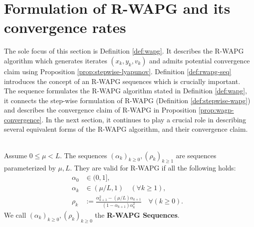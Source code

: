 \documentclass[12pt]{article}
\begin{document}
\section{Formulation of R-WAPG and its convergence rates}
    The sole focus of this section is Definition \ref{def:wapg}.
    It describes the R-WAPG algorithm which generates iterates $(x_k, y_k, v_k)$ and admits potential convergence claim using Proposition \ref{prop:stepwise-lyapunov}. 
    Definition \ref{def:rwapg-seq} introduces the concept of an R-WAPG sequences which is crucially important. 
    The sequence formulates the R-WAPG algorithm stated in Definition \ref{def:wapg}, it connects the step-wise formulation of R-WAPG (Definition \ref{def:stepwise-wapg}) and describes the convergence claim of R-WAPG in Proposition \ref{prop:wagp-convergence}. 
    In the next section, it continues to play a crucial role in describing several equivalent forms of the R-WAPG algorithm, and their convergence claim. 
    \begin{definition}\label{def:rwapg-seq}\;\\
        Assume $0 \le \mu < L$. 
        The sequences $(\alpha_k)_{k \ge 0}, (\rho_k)_{k \ge1}$ are sequences parameterized by $\mu, L$. 
        They are valid for R-WAPG if all the following holds: 
        \begin{align*}
            \alpha_0 &\in (0, 1], 
            \\
            \alpha_k &\in (\mu/L, 1) \quad (\forall k \ge 1), 
            \\
            \rho_k &:= \frac{\alpha_{k + 1}^2 - (\mu/L)\alpha_{k + 1}}{(1 - \alpha_{k + 1})\alpha_k^2} \quad \forall (k \ge 0). 
        \end{align*}
        We call $(\alpha_k)_{k \ge 0}, (\rho_k)_{k \ge 0}$ the \textbf{R-WAPG Sequences}. 
    \end{definition}
\end{document}

